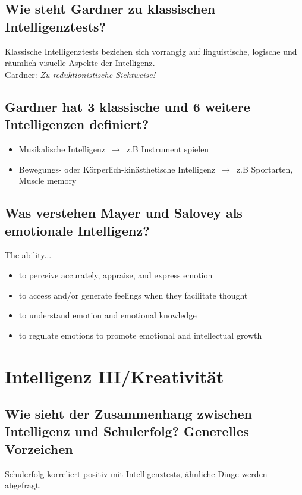\documentclass[a6paper,9pt,DIV=14]{scrartcl}
\begin{document}
\subsection{Wie steht Gardner zu klassischen Intelligenztests?}
Klassische Intelligenztests beziehen sich vorrangig auf linguistische, logische und
räumlich-visuelle Aspekte der Intelligenz.\\
Gardner: \textit{Zu reduktionistische Sichtweise!}
\subsection{Gardner hat 3 klassische und 6 weitere Intelligenzen definiert?} %
\begin{itemize}
\item Musikalische Intelligenz $\,\to\,$ z.B Instrument spielen
\item Bewegungs- oder Körperlich-kinästhetische Intelligenz $\,\to\,$ z.B Sportarten, Muscle memory
\end{itemize}
\subsection{Was verstehen Mayer und Salovey als emotionale Intelligenz?} %
The ability...
\begin{itemize}
\item to perceive accurately, appraise, and express emotion
\item to access and/or generate feelings when they facilitate thought
\item to understand emotion and emotional knowledge
\item to regulate emotions to promote emotional and intellectual growth
\end{itemize}

\section{Intelligenz III/Kreativität}

\subsection{Wie sieht der Zusammenhang zwischen Intelligenz und Schulerfolg? Generelles Vorzeichen}
    Schulerfolg korreliert positiv mit Intelligenztests, ähnliche Dinge werden abgefragt.
\end{document}
